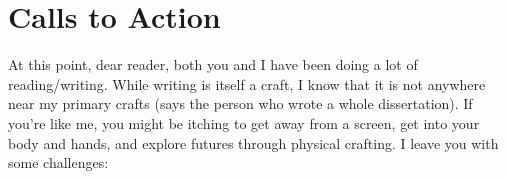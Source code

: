 










\section{Calls to Action}

At this point, dear reader, both you and I have been doing a lot of reading/writing. While writing is itself a craft, I know that it is not anywhere near my primary crafts (says the person who wrote a whole dissertation). If you're like me, you might be itching to get away from a screen, get into your body and hands, and explore futures through physical crafting. I leave you with some challenges:

